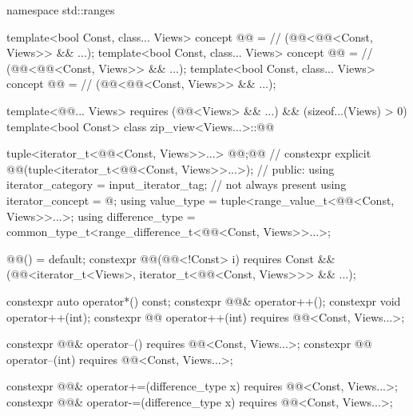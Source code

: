 %
\begin{codeblock}
namespace std::ranges {
  template<bool Const, class... Views>
    concept @@ =                 // \expos
      (@@<@@<Const, Views>> && ...);
  template<bool Const, class... Views>
    concept @@ =                 // \expos
      (@@<@@<Const, Views>> && ...);
  template<bool Const, class... Views>
    concept @@ =                       // \expos
      (@@<@@<Const, Views>> && ...);

  template<@@... Views>
    requires (@@<Views> && ...) && (sizeof...(Views) > 0)
  template<bool Const>
  class zip_view<Views...>::@@ {
    tuple<iterator_t<@@<Const, Views>>...> @@;@\itcorr[-1]@       // \expos
    constexpr explicit @@(tuple<iterator_t<@@<Const, Views>>...>);
                                                                            // \expos
  public:
    using iterator_category = input_iterator_tag;                           // not always present
    using iterator_concept  = @\seebelow@;
    using value_type = tuple<range_value_t<@@<Const, Views>>...>;
    using difference_type = common_type_t<range_difference_t<@@<Const, Views>>...>;

    @@() = default;
    constexpr @@(@@<!Const> i)
      requires Const && (@@<iterator_t<Views>,
                                        iterator_t<@@<Const, Views>>> && ...);

    constexpr auto operator*() const;
    constexpr @@& operator++();
    constexpr void operator++(int);
    constexpr @@ operator++(int) requires @@<Const, Views...>;

    constexpr @@& operator--() requires @@<Const, Views...>;
    constexpr @@ operator--(int) requires @@<Const, Views...>;

    constexpr @@& operator+=(difference_type x)
      requires @@<Const, Views...>;
    constexpr @@& operator-=(difference_type x)
      requires @@<Const, Views...>;

}}
\end{codeblock}
